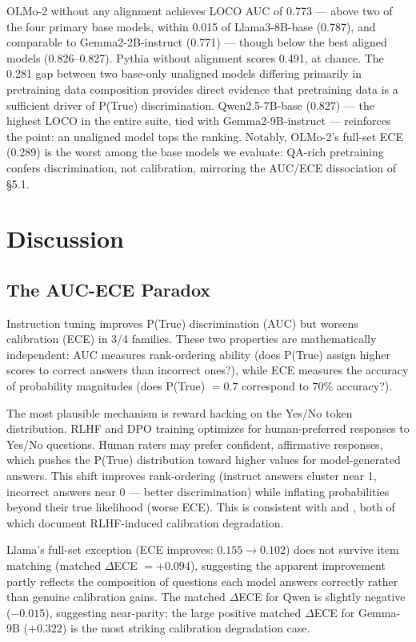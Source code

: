 \documentclass[11pt]{article}
\begin{document}
OLMo-2 without any alignment achieves LOCO AUC of 0.773 --- above two of the four primary base models, within 0.015 of Llama3-8B-base (0.787), and comparable to Gemma2-2B-instruct (0.771) --- though below the best aligned models (0.826--0.827). Pythia without alignment scores 0.491, at chance. The 0.281 gap between two base-only unaligned models differing primarily in pretraining data composition provides direct evidence that pretraining data is a sufficient driver of P(True) discrimination. Qwen2.5-7B-base (0.827) --- the highest LOCO in the entire suite, tied with Gemma2-9B-instruct --- reinforces the point: an unaligned model tops the ranking. Notably, OLMo-2's full-set ECE (0.289) is the worst among the base models we evaluate: QA-rich pretraining confers discrimination, not calibration, mirroring the AUC/ECE dissociation of \S5.1.

\section{Discussion}

\subsection{The AUC-ECE Paradox}

Instruction tuning improves P(True) discrimination (AUC) but worsens calibration (ECE) in 3/4 families. These two properties are mathematically independent: AUC measures rank-ordering ability (does P(True) assign higher scores to correct answers than incorrect ones?), while ECE measures the accuracy of probability magnitudes (does P(True) $= 0.7$ correspond to 70\% accuracy?).

The most plausible mechanism is reward hacking on the Yes/No token distribution. RLHF and DPO training optimizes for human-preferred responses to Yes/No questions. Human raters may prefer confident, affirmative responses, which pushes the P(True) distribution toward higher values for model-generated answers. This shift improves rank-ordering (instruct answers cluster near 1, incorrect answers near 0 --- better discrimination) while inflating probabilities beyond their true likelihood (worse ECE). This is consistent with \citet{tian2023} and \citet{openai2023}, both of which document RLHF-induced calibration degradation.

Llama's full-set exception (ECE improves: $0.155 \to 0.102$) does not survive item matching (matched $\Delta$ECE $= +0.094$), suggesting the apparent improvement partly reflects the composition of questions each model answers correctly rather than genuine calibration gains. The matched $\Delta$ECE for Qwen is slightly negative ($-0.015$), suggesting near-parity; the large positive matched $\Delta$ECE for Gemma-9B ($+0.322$) is the most striking calibration degradation case.
\end{document}
